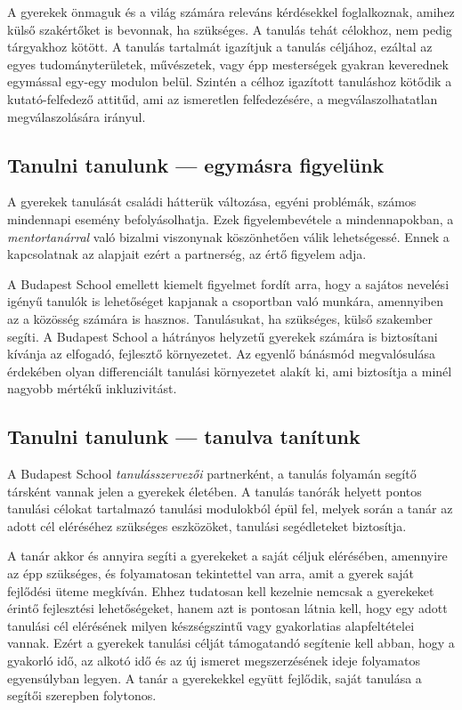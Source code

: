 A gyerekek önmaguk és a világ számára releváns kérdésekkel foglalkoznak,
amihez külső szakértőket is bevonnak, ha szükséges. A tanulás tehát
célokhoz, nem pedig tárgyakhoz kötött. A tanulás tartalmát igazítjuk a
tanulás céljához, ezáltal az egyes tudományterületek, művészetek, vagy
épp mesterségek gyakran keverednek egymással egy-egy modulon belül.
Szintén a célhoz igazított tanuláshoz kötődik a kutató-felfedező
attitűd, ami az ismeretlen felfedezésére, a megválaszolhatatlan
megválaszolására irányul.

\vspace*{.5ex}
\hypertarget{tanulni-tanulunk-egymasra-figyelunk}{%
\subsection{Tanulni tanulunk --- egymásra
figyelünk}\label{tanulni-tanulunk-egymasra-figyelunk}}

A gyerekek tanulását családi hátterük változása, egyéni problémák,
számos mindennapi esemény befolyásolhatja. Ezek figyelembevétele a
mindennapokban, a \emph{mentortanárral} való bizalmi viszonynak
köszönhetően válik lehetségessé. Ennek a kapcsolatnak az alapjait ezért
a partnerség, az értő figyelem adja.

A Budapest School emellett kiemelt figyelmet fordít arra, hogy a sajátos
nevelési igényű tanulók is lehetőséget kapjanak a csoportban való
munkára, amennyiben az a közösség számára is hasznos. Tanulásukat, ha
szükséges, külső szakember segíti. A Budapest School a hátrányos
helyzetű gyerekek számára is biztosítani kívánja az elfogadó, fejlesztő
környezetet. Az egyenlő bánásmód megvalósulása érdekében olyan
differenciált tanulási környezetet alakít ki, ami biztosítja a minél
nagyobb mértékű inkluzivitást.

\vspace*{.5ex}
\hypertarget{tanulni-tanulunk-tanulva-tanitunk}{%
\subsection{Tanulni tanulunk --- tanulva
tanítunk}\label{tanulni-tanulunk-tanulva-tanitunk}}

A Budapest School \emph{tanulásszervezői} partnerként, a tanulás
folyamán segítő társként vannak jelen a gyerekek életében. A tanulás
tanórák helyett pontos tanulási célokat tartalmazó tanulási modulokból
épül fel, melyek során a tanár az adott cél eléréséhez szükséges
eszközöket, tanulási segédleteket biztosítja.

A tanár akkor és annyira segíti a gyerekeket a saját céljuk elérésében,
amennyire az épp szükséges, és folyamatosan tekintettel van arra, amit a
gyerek saját fejlődési üteme megkíván. Ehhez tudatosan kell kezelnie
nemcsak a gyerekeket érintő fejlesztési lehetőségeket, hanem azt is
pontosan látnia kell, hogy egy adott tanulási cél elérésének milyen
készségszintű vagy gyakorlatias alapfeltételei vannak. Ezért a gyerekek
tanulási célját támogatandó segítenie kell abban, hogy a gyakorló idő,
az alkotó idő és az új ismeret megszerzésének ideje folyamatos
egyensúlyban legyen. A tanár a gyerekekkel együtt fejlődik, saját
tanulása a segítői szerepben folytonos.
